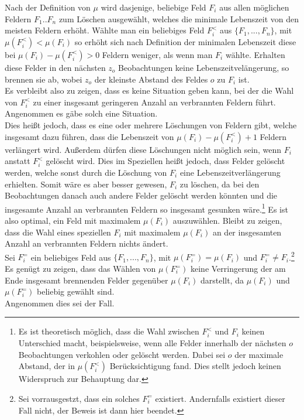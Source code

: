 Nach der Definition von $\mu$ wird dasjenige, beliebige Feld $F_i$ aus allen möglichen Feldern $F_1..F_n$ zum Löschen ausgewählt, welches die minimale Lebenszeit von den meisten Feldern erhöht. Wählte man ein beliebiges Feld $F_i^<$ aus $\{F_1,...,F_n\}$, mit $\mu(F_i^<) < \mu(F_i)$ so erhöht sich nach Definition der minimalen Lebenszeit diese bei $\mu(F_i) - \mu(F_i^<) > 0$ Feldern weniger, als wenn man $F_i$ wählte. Erhalten diese Felder in den nächsten $z_o$ Beobachtungen keine Lebenszeitvelängerung, so brennen sie ab, wobei $z_o$ der kleinste Abstand des Feldes $o$ zu $F_i$ ist.\\
Es verbleibt also zu zeigen, dass es keine Situation geben kann, bei der die Wahl von $F_i^<$ zu einer insgesamt geringeren Anzahl an verbrannten Feldern führt.\\
Angenommen es gäbe solch eine Situation.\\
Dies heißt jedoch, dass es eine oder mehrere Löschungen von Feldern gibt, welche insgesamt dazu führen, dass die Lebenszeit von $\mu(F_i) - \mu(F_i^<) + 1$ Feldern verlängert wird. Außerdem dürfen diese Löschungen nicht möglich sein, wenn $F_i$ anstatt $F_i^<$ gelöscht wird. Dies im Speziellen heißt jedoch, dass Felder gelöscht werden, welche sonst durch die Löschung von $F_i$ eine Lebenszeitverlängerung erhielten. Somit wäre es aber besser gewesen, $F_i$ zu löschen, da bei den Beobachtungen danach auch andere Felder gelöscht werden könnten und die insgesamte Anzahl an verbrannten Feldern so insgesamt gesunken wäre.\footnote{Es ist theoretisch möglich, dass die Wahl zwischen $F_i^<$ und $F_i$ keinen Unterschied macht, beispielsweise, wenn alle Felder innerhalb der nächsten $o$ Beobachtungen verkohlen oder gelöscht werden. Dabei sei $o$ der maximale Abstand, der in $\mu(F_i^<)$ Berücksichtigung fand. Dies stellt jedoch keinen Widerspruch zur Behauptung dar.}
Es ist also optimal, ein Feld mit maximalem $\mu(F_i)$ auszuwählen. Bleibt zu zeigen, dass die Wahl eines speziellen $F_i$ mit maximalem $\mu(F_i)$ an der insgesamten Anzahl an verbrannten Feldern nichts ändert.\\
Sei $F_i^=$ ein beliebiges Feld aus $\{F_1,...,F_n\}$, mit $\mu(F_i^=) = \mu(F_i)$ und $F_i^= \not= F_i$.\footnote{Sei vorrausgestzt, dass ein solches $F_i^=$ existiert. Andernfalls existiert dieser Fall nicht, der Beweis ist dann hier beendet.}\\
Es genügt zu zeigen, dass das Wählen von $\mu(F_i^=)$ keine Verringerung der am Ende insgesamt brennenden Felder gegenüber  $\mu(F_i)$ darstellt, da $\mu(F_i)$ und $\mu(F_i^=)$ beliebig gewählt sind.\\
Angenommen dies sei der Fall.\\


